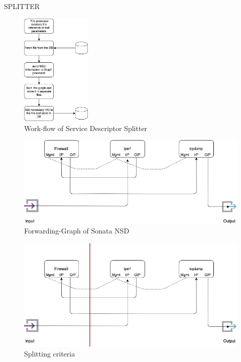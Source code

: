 \begin{frame}
\Huge{\centerline{SPLITTER}}
\end{frame}


\begin{frame}	
\begin{figure} [!]
	\centering
	\includegraphics[width=0.3\textwidth]{images/img-1-split}
	\caption{Work-flow of Service Descriptor Splitter}
\end{figure}
\end{frame}

\begin{frame}
\begin{figure}
	\centering 
	\includegraphics[width=0.5\linewidth]{images/img-2-split}
	\caption{Forwarding-Graph of Sonata NSD}
\end{figure}

\begin{figure}
	\centering 
	\includegraphics[width=0.5\linewidth]{images/img-3-split}
	\caption{Splitting criteria}
\end{figure}
\end{frame}


